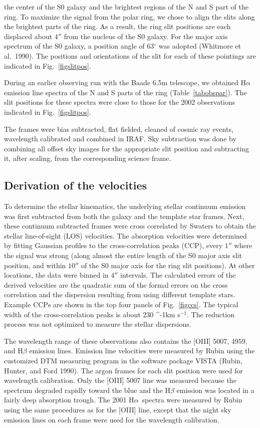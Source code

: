\documentclass[manuscript]{aastex}
\def\Halpha{H$\alpha$}
\def\kms{\ifmmode\mathrm{~km~}\mathrm{s}^{-1}\else km s$^{-1}$\fi}
\begin{document}
\noindent the center of the S0 galaxy and the brightest regions of the
N and S part of the ring.  To maximize the signal from the polar ring,
we chose to align the slits along the brightest parts of the ring. As
a result, the ring slit positions are each displaced about $4''$ from
the nucleus of the S0 galaxy. For the major axis spectrum of the S0
galaxy, a position angle of 63$^\circ$ was adopted (Whitmore et al.\
1990). The positions and orientations of the slit for each of these
pointings are indicated in Fig.~\ref{figslitpos}.

During an earlier observing run with the Baade 6.5m telescope, we
obtained H$\alpha$ emission line spectra of the N and S parts of the
ring (Table~\ref{tabobspar}).  The slit positions for these spectra
were close to those for the 2002 observations indicated in
Fig.~\ref{figslitpos}. 

The frames were bias subtracted, flat fielded, cleaned of cosmic ray
events, wavelength calibrated and combined in IRAF.  Sky subtraction
was done by combining all offset sky images for the appropriate slit
position and subtracting it, after scaling, from the corresponding
science frame.

\subsection{Derivation of the velocities}

To determine the stellar kinematics, the underlying stellar continuum
emission was first subtracted from both the galaxy and the template
star frames. Next, these continuum subtracted frames were cross
correlated by Swaters to obtain the stellar line-of-sight (LOS)
velocities.  The absorption velocities were determined by fitting
Gaussian profiles to the cross-correlation peaks (CCP), every $1''$
where the signal was strong (along almost the entire length of the S0
major axis slit position, and within $10''$ of the S0 major axis for
the ring slit positions). At other locations, the data were binned in
$4''$ intervals.  The calculated errors of the derived velocities are
the quadratic sum of the formal errors on the cross correlation and
the dispersion resulting from using different template stars. Example
CCPs are shown in the top four panels of Fig.~\ref{figccs}. The
typical width of the cross-correlation peaks is about 230 \kms. The
reduction process was not optimized to measure the stellar
dispersions.

The wavelength range of these observations also contains the [OIII]
5007, 4959, and H$\beta$ emission lines. Emission line velocities were
measured by Rubin using the customized DTM measuring program in the
software package VISTA (Rubin, Hunter, and Ford 1990). The argon
frames for each slit position were used for wavelength
calibration. Only the [OIII] 5007 line was measured because the
spectrum degraded rapidly toward the blue and the H$\beta$ emission
was located in a fairly deep absorption trough.  The 2001 \Halpha\
spectra were measured by Rubin using the same procedures as for the
[OIII] line, except that the night sky emission lines on each frame
were used for the wavelength calibration.
\end{document}
